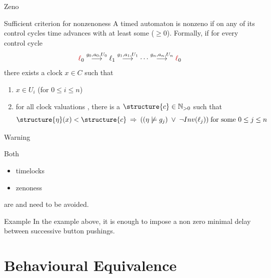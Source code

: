 \documentclass[aspectratio=169]{beamer}
\def\tran#1{\stackrel{#1}{\longrightarrow}}
\begin{document}
\begin{slide}{Zeno}
\small


\begin{block}{Sufficient criterion for nonzenoness}
A timed automaton is nonzeno if on any of its control cycles time advances with at least some  
 ($\geq 0$). Formally, if for every control cycle
\begin{equation*}
{\red \ell_0} \tran{g_0, a_0, U_0} \ell_1 \tran{g_1, a_1, U_1} \cdots  \tran{g_n, a_n, U_n} {\red \ell_0} 
\end{equation*}
there exists a clock $x \in C$ such that
\begin{enumerate}
\item  $x \in U_i$ (for $0 \leq i \leq n$)
\item for all clock valuations \structure{$\eta$}, there is a  $\structure{c} \in \N_{>0}$ such that
\begin{equation*}
\structure{\eta}(x) < \structure{c}\; \imp\; ((\eta \not\models g_j)\; \lor\; \lnot Inv(\ell_j)) \; \text{for some $0 \leq j \leq n$}
\end{equation*}
\end{enumerate}


\end{block}

\end{slide}


\begin{slide}{Warning}
\small

Both 
\begin{itemize}
\item timelocks
\item zenoness
\end{itemize}
are  and need to be avoided.


\begin{block}{Example}
In the example above, it is enough to impose a non zero minimal delay  between successive button pushings.
\end{block}

\end{slide}





\section{Behavioural Equivalence}
\end{document}
